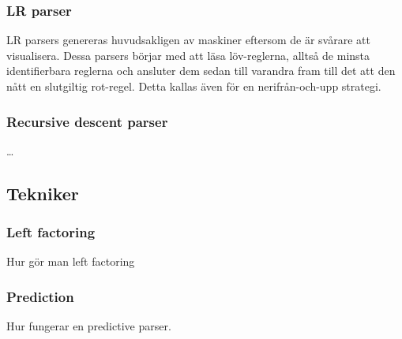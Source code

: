 \subsubsection{LR parser}

LR parsers genereras huvudsakligen av maskiner eftersom de är svårare att
visualisera. Dessa parsers börjar med att läsa löv-reglerna, alltså de minsta
identifierbara reglerna och ansluter dem sedan till varandra fram till det att
den nått en slutgiltig rot-regel. Detta kallas även för en nerifrån-och-upp
strategi.

\subsubsection{Recursive descent parser}

\ldots

\subsection{Tekniker}

\subsubsection{Left factoring}

Hur gör man left factoring

\subsubsection{Prediction}

Hur fungerar en predictive parser.


% 
% 
% 


